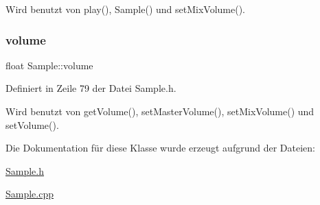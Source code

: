 Wird benutzt von play(), Sample() und set\+Mix\+Volume().

\mbox{\label{class_sample_a74a4b4799b2bdec9fdde363992b9cec8}} 
\subsubsection{\texorpdfstring{volume}{volume}}
{\footnotesize\ttfamily float Sample\+::volume\hspace{0.3cm}{\ttfamily [private]}}



Definiert in Zeile 79 der Datei Sample.\+h.



Wird benutzt von get\+Volume(), set\+Master\+Volume(), set\+Mix\+Volume() und set\+Volume().



Die Dokumentation für diese Klasse wurde erzeugt aufgrund der Dateien\+:\begin{DoxyCompactItemize}
\item 
\hyperlink{_sample_8h}{Sample.\+h}\item 
\hyperlink{_sample_8cpp}{Sample.\+cpp}\end{DoxyCompactItemize}
